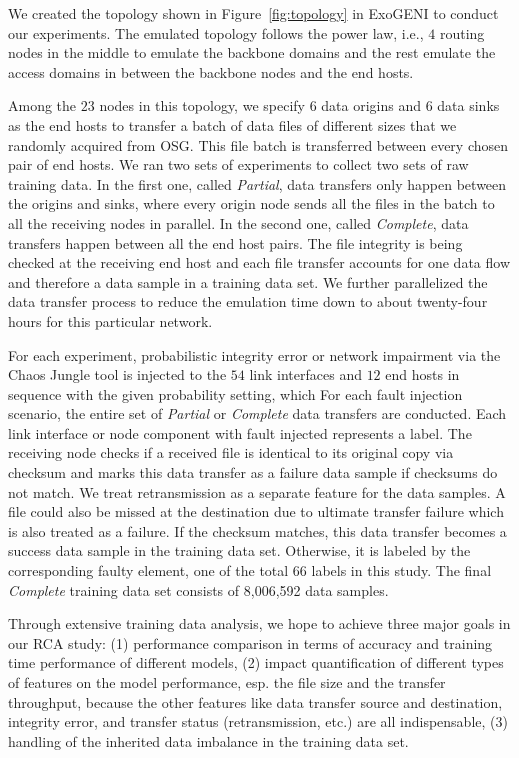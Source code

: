 We created the topology shown in Figure~\ref{fig:topology} in ExoGENI to conduct our experiments.  The emulated topology follows the power law, i.e., $4$ routing 
nodes in the middle to emulate the backbone domains and the rest emulate the access domains in between the backbone nodes and the end hosts. 

Among the $23$ nodes in this topology, we specify $6$ data origins and $6$ data sinks as the end hosts to transfer a batch of data files of different sizes that we randomly acquired from OSG. 
This file batch is transferred between every chosen pair of end hosts. We ran two sets of experiments to collect two sets of raw training data. In the first one, called {\it Partial},
data transfers only happen between the origins and sinks, where every origin node sends all the files in the batch 
to all the receiving nodes in parallel. In the second one, called {\it Complete}, data transfers happen between all the end host pairs. 
The file integrity is being checked at the receiving end host and each file transfer accounts for one data flow and therefore 
a data sample in a training data set. We further parallelized the data transfer process to reduce the emulation time down to about twenty-four hours for this particular network.  

For each experiment, probabilistic integrity error or network impairment via the Chaos Jungle tool is injected to the $54$ link interfaces and $12$ end hosts in sequence with the given probability setting, which 
For each fault injection scenario, the entire set of {\it Partial} or {\it Complete} data transfers are conducted. Each link interface or node component with fault injected represents a label.  
The receiving node checks if a received file is identical to its original copy via checksum and marks this data transfer as a failure data sample if checksums do not match. 
We treat retransmission as a separate feature for the data samples.  A file could also be missed at the destination due to ultimate transfer failure which is also treated as a failure. 
If the checksum matches, this data transfer becomes a success data sample in the training data set. Otherwise, it is labeled by the corresponding faulty element, one of the total $66$ labels in this study. 
The final {\it Complete} training data set consists of 8,006,592 data samples.

Through extensive training data analysis, we hope to achieve three major goals in our RCA study: (1) performance comparison in terms of accuracy and training time performance of different models, 
(2) impact quantification of different types of features on the model performance, esp. the file size and the transfer throughput, because the other features like data transfer source and destination, integrity error, 
and transfer status (retransmission, etc.) are all indispensable, (3) handling of the inherited data imbalance in the training data set. 

